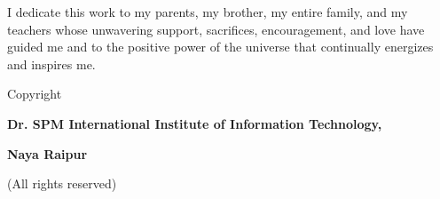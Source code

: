 \thispagestyle{empty}%
\vspace*{0.25\textheight}
\begin{center}
\vspace*{0.5\baselineskip}
{ {\sf 
 I dedicate this work to my parents, my brother, my entire family, and my teachers whose unwavering support, sacrifices, encouragement, and love have guided me and to the positive power of the universe that continually energizes and inspires me. }}\\
\end{center}
\clearpage
\cleardoublepage

\thispagestyle{empty}


\vspace*{2.5cm}
\begin{flushright}
\end{flushright}
\baselineskip
\centerline{\large Copyright \textcopyright}
\vspace*{0.3cm}
\centerline{\Large \bf  Dr. SPM International Institute of Information Technology,}
\centerline{\Large \bf Naya Raipur}
\vspace*{0.3cm}
\centerline{(\large All rights reserved)}
\baselineskip